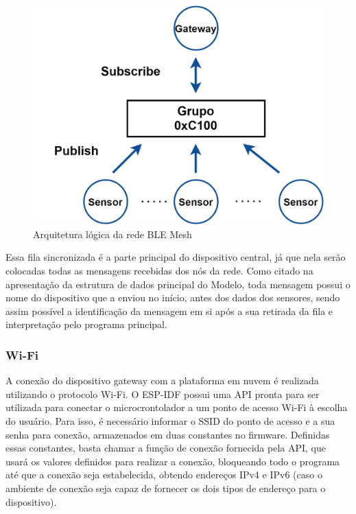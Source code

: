 \documentclass[../monografia.tex]{subfiles}
\begin{document}
\begin{figure}[h!]
	\centering
	\includegraphics[scale=0.22]{ble-mesh-architecture.png}
	\caption{Arquitetura lógica da rede BLE Mesh}
	\label{fig:mesh-network-architecture}
\end{figure}

Essa fila sincronizada é a parte principal do dispositivo central, já que nela serão colocadas todas as mensagens recebidas dos nós da rede. Como citado na apresentação da estrutura de dados principal do Modelo, toda mensagem possui o nome do dispositivo que a enviou no início, antes dos dados dos sensores, sendo assim possível a identificação da mensagem em si após a sua retirada da fila e interpretação pelo programa principal.


\subsubsection{Wi-Fi} \label{dev-Wi-Fi}

A conexão do dispositivo gateway com a plataforma em nuvem é realizada utilizando o protocolo Wi-Fi. O ESP-IDF possui uma API pronta para ser utilizada para conectar o microcrontolador a um ponto de acesso Wi-Fi à escolha do usuário. Para isso, é necessário informar o SSID do ponto de acesso e a sua senha para conexão, armazenados em duas constantes no firmware. Definidas essas constantes, basta chamar a função de conexão fornecida pela API, que usará os valores definidos para realizar a conexão, bloqueando todo o programa até que a conexão seja estabelecida, obtendo endereços IPv4 e IPv6 (caso o ambiente de conexão seja capaz de fornecer os dois tipos de endereço para o dispositivo).
\end{document}
